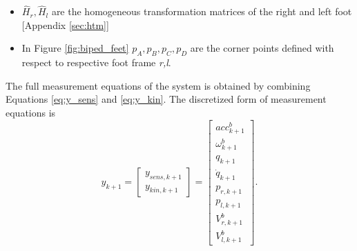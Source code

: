 \begin{itemize}
\item $\hat{H}_{r},\hat{H}_{l}$ are the homogeneous transformation matrices of the right and left foot [Appendix \ref{sec:htm}]
\item In Figure \ref{fig:biped_feet} $p_A,p_B,p_C,p_D$ are the corner points defined with respect to respective foot frame \emph{r,l}.
\end{itemize}
The full measurement equations of the system is obtained by combining Equations \ref{eq:y_sens} and \ref{eq:y_kin}. The discretized form of measurement equations is
\begin{equation}
    \label{eq:y_msr}
    y_{k+1} = \begin{bmatrix} y_{sens,k+1} \\ y_{kin,k+1} \end{bmatrix}= \begin{bmatrix} acc^b_{k+1} \\ \omega^b_{k+1} \\ q_{k+1} \\ \dot q_{k+1} \\ p_{r,k+1} \\ p_{l,k+1} \\ V^b_{r,k+1} \\ V^b_{l,k+1} \end{bmatrix}.
\end{equation}

